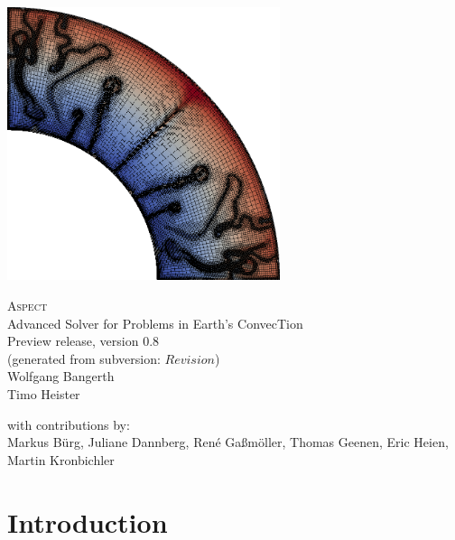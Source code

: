 \documentclass{article}
\newcommand{\aspect}{\textsc{Aspect}}
\begin{document}
\thispagestyle{empty}
\vspace*{.2\textheight}

\begin{centering}
  \parindent0pt
  \includegraphics[width=0.6\textwidth]{mesh-2d.png}

  \vfill

  {\huge \aspect{}}
  \\[.3cm]
  {\Large
    Advanced Solver for Problems in Earth's
    ConvecTion}
  \\[.5cm]
  {\large Preview release, version 0.8\\
   (generated from subversion: $Revision$)}
  \\[1cm]
  {\large
    Wolfgang Bangerth\\
    Timo Heister\\[24pt]
  }
\end{centering}
{\parindent0pt
 \large
    with contributions by:\\
    Markus B{\"u}rg,
    Juliane Dannberg,
    Ren{\'e} Ga{\ss}m{\"o}ller,
    Thomas Geenen,
    Eric Heien,
    Martin Kronbichler
}



\pagebreak

\tableofcontents

\pagebreak

\section{Introduction}
\end{document}
